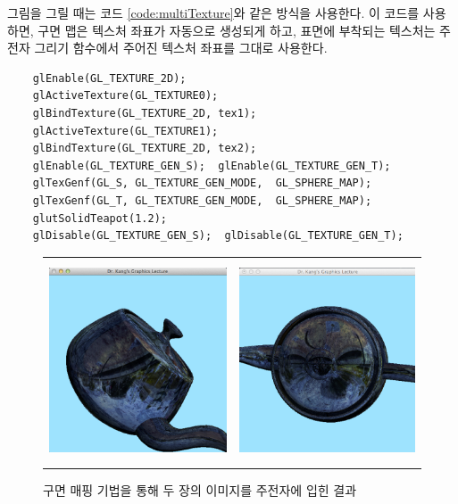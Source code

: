 그림을 그릴 때는 코드 \ref{code:multiTexture}와 같은 방식을 사용한다.
이 코드를 사용하면, 구면 맵은 텍스처 좌표가 자동으로 생성되게 하고, 표면에 부착되는 텍스처는 주전자 그리기 함수에서 주어진 텍스처 좌표를 그대로 사용한다.

\begin{algorithmbis}\label{code:multiTexture}
\lstset{language=C++} 
\begin{lstlisting}
    glEnable(GL_TEXTURE_2D);
    glActiveTexture(GL_TEXTURE0);
    glBindTexture(GL_TEXTURE_2D, tex1);
    glActiveTexture(GL_TEXTURE1);
    glBindTexture(GL_TEXTURE_2D, tex2);
    glEnable(GL_TEXTURE_GEN_S);  glEnable(GL_TEXTURE_GEN_T);
    glTexGenf(GL_S, GL_TEXTURE_GEN_MODE,  GL_SPHERE_MAP);
    glTexGenf(GL_T, GL_TEXTURE_GEN_MODE,  GL_SPHERE_MAP);
    glutSolidTeapot(1.2);
    glDisable(GL_TEXTURE_GEN_S);  glDisable(GL_TEXTURE_GEN_T);
\end{lstlisting}
\end{algorithmbis}

\begin{figure}[h!]
  \centering
	\begin{tabular}{cc}
	\includegraphics[height=6cm]{OGL_texture/multiTexturedA.png} &
	\includegraphics[height=6cm]{OGL_texture/multiTexturedB.png}  \\
	\end{tabular}
    \caption{구면 매핑 기법을 통해 두 장의 이미지를 주전자에 입힌 결과}
    \label{fig:OGL_texture:multiTextured}
\end{figure}

